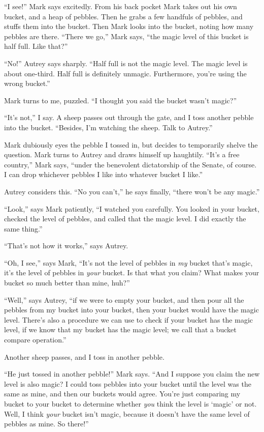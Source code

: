 {
 ``I see!'' Mark says excitedly.
From his back pocket Mark takes out his own bucket, and a heap of
pebbles. Then he grabs a few handfuls of pebbles, and stuffs them into
the bucket. Then Mark looks into the bucket, noting how many pebbles
are there. ``There we go,'' Mark
says, ``the magic level of this bucket is half full.
Like that?''}

{
 ``No!'' Autrey says sharply.
``Half full is not the magic level. The magic level is
about one-third. Half full is definitely unmagic. Furthermore,
you're using the wrong bucket.''}

{
 Mark turns to me, puzzled. ``I thought you said
the bucket wasn't magic?''}

{
 ``It's not,'' I
say. A sheep passes out through the gate, and I toss another pebble
into the bucket. ``Besides, I'm
watching the sheep. Talk to Autrey.''}

{
 Mark dubiously eyes the pebble I tossed in, but decides to
temporarily shelve the question. Mark turns to Autrey and draws himself
up haughtily. ``It's a free
country,'' Mark says, ``under the
benevolent dictatorship of the Senate, of course. I can drop whichever
pebbles I like into whatever bucket I like.''}

{
 Autrey considers this. ``No you
can't,'' he says finally,
``there won't be any
magic.''}

{
 ``Look,'' says Mark patiently,
``I watched you carefully. You looked in your bucket,
checked the level of pebbles, and called that the magic level. I did
exactly the same thing.''}

{
 ``That's not how it
works,'' says Autrey.}

{
 ``Oh, I see,'' says Mark,
``It's not the level of pebbles in
\textit{my} bucket that's magic, it's
the level of pebbles in \textit{your} bucket. Is that what you claim?
What makes your bucket so much better than mine,
huh?''}

{
 ``Well,'' says Autrey,
``if we were to empty your bucket, and then pour all
the pebbles from my bucket into your bucket, then your bucket would
have the magic level. There's also a procedure we can
use to check if your bucket has the magic level, if we know that my
bucket has the magic level; we call that a bucket compare
operation.''}

{
 Another sheep passes, and I toss in another pebble.}

{
 ``He just tossed in another
pebble!'' Mark says. ``And I suppose
you claim the new level is also magic? I could toss pebbles into your
bucket until the level was the same as mine, and then our buckets would
agree. You're just comparing my bucket to your bucket
to determine whether \textit{you} think the level is
`magic' or not. Well, I think
\textit{your} bucket isn't magic, because it
doesn't have the same level of pebbles as mine. So
there!''}

